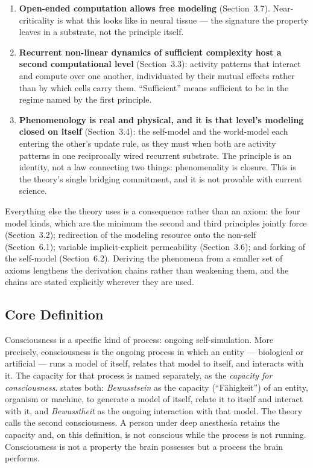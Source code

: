 \documentclass[12pt]{article}
\begin{document}
\begin{enumerate}
\item \textbf{Open-ended computation allows free modeling} (Section~3.7). Near-criticality is what this looks like in neural tissue --- the signature the property leaves in a substrate, not the principle itself.
\item \textbf{Recurrent non-linear dynamics of sufficient complexity host a second computational level} (Section~3.3): activity patterns that interact and compute over one another, individuated by their mutual effects rather than by which cells carry them. ``Sufficient'' means sufficient to be in the regime named by the first principle.
\item \textbf{Phenomenology is real and physical, and it is that level's modeling closed on itself} (Section~3.4): the self-model and the world-model each entering the other's update rule, as they must when both are activity patterns in one reciprocally wired recurrent substrate. The principle is an identity, not a law connecting two things: phenomenality is closure. This is the theory's single bridging commitment, and it is not provable with current science.
\end{enumerate}

Everything else the theory uses is a consequence rather than an axiom: the four model kinds, which are the minimum the second and third principles jointly force (Section~3.2); redirection of the modeling resource onto the non-self (Section~6.1); variable implicit-explicit permeability (Section~3.6); and forking of the self-model (Section~6.2). Deriving the phenomena from a smaller set of axioms lengthens the derivation chains rather than weakening them, and the chains are stated explicitly wherever they are used.



\subsection{Core Definition}


Consciousness is a specific kind of process: ongoing self-simulation. More precisely, consciousness is the ongoing process in which an entity --- biological or artificial --- runs a model of itself, relates that model to itself, and interacts with it. The capacity for that process is named separately, as the \emph{capacity for consciousness}. \citet[p.~58]{Gruber2015} states both: \emph{Bewusstsein} as the capacity (``F\"ahigkeit'') of an entity, organism or machine, to generate a model of itself, relate it to itself and interact with it, and \emph{Bewusstheit} as the ongoing interaction with that model. The theory calls the second consciousness. A person under deep anesthesia retains the capacity and, on this definition, is not conscious while the process is not running. Consciousness is not a property the brain possesses but a process the brain performs.
\end{document}
